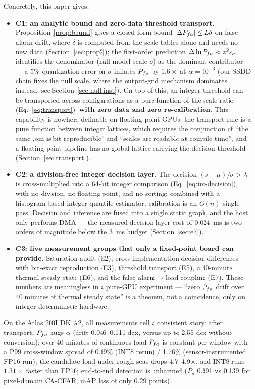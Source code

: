 Concretely, this paper gives:
\begin{itemize}
\item \textbf{C1: an analytic bound and zero-data threshold transport.}
Proposition~\ref{prop:bound} gives a closed-form bound $|\Delta P_{fa}|\le L\delta$ on false-alarm drift, where $\delta$ is computed from the scale tables alone and needs no new data (Section~\ref{sec:prop2}); the first-order prediction $\Delta\ln P_{fa}\approx z^2\varepsilon_\sigma$ identifies the denominator (null-model scale $\sigma$) as the dominant contributor --- a 5\% quantization error on $\sigma$ inflates $P_{fa}$ by $1.6\times$ at $\alpha=10^{-3}$ (our SSDD chain fixes the null scale, where the output-grid mechanism dominates instead; see Section~\ref{sec:null-inst}).
On top of this, an integer threshold can be transported across configurations as a pure function of the scale ratio (Eq.~\eqref{eq:transport}), \textbf{with zero data and zero re-calibration}.
This capability is nowhere definable on floating-point GPUs: the transport rule is a pure function between integer lattices, which requires the conjunction of ``the same .om is bit-reproducible'' and ``scales are readable at compile time'', and a floating-point pipeline has no global lattice carrying the decision threshold (Section~\ref{sec:transport}).
\item \textbf{C2: a division-free integer decision layer.}
The decision $(s-\mu)/\sigma>\lambda$ is cross-multiplied into a 64-bit integer comparison (Eq.~\eqref{eq:int-decision}), with no division, no floating point, and no sorting; combined with a histogram-based integer quantile estimator, calibration is an $O(n)$ single pass.
Decision and inference are fused into a single static graph, and the host only performs DMA --- the measured decision-layer cost of 0.024~ms is two orders of magnitude below the 3~ms budget (Section~\ref{sec:e7}).
\item \textbf{C3: five measurement groups that only a fixed-point board can provide.}
Saturation audit (E2), cross-implementation decision differences with bit-exact reproduction (E3), threshold transport (E5), a 40-minute thermal steady state (E6), and the false-alarm$\to$load coupling (E7).
These numbers are meaningless in a pure-GPU experiment --- ``zero $P_{fa}$ drift over 40 minutes of thermal steady state'' is a theorem, not a coincidence, only on integer-deterministic hardware.
\end{itemize}

On the Atlas 200I DK A2, all measurements tell a consistent story: after transport, $P_{fa}$ hugs $\alpha$ (drift 0.046--0.111 dex, versus up to 2.55 dex without conversion); over 40 minutes of continuous load $P_{fa}$ is constant per window with a P99 cross-window spread of 0.69\% (INT8 rerun) / 1.76\% (sensor-instrumented FP16 run); the candidate load under rough seas drops 4.7--4.9$\times$, and INT8 runs $1.31\times$ faster than FP16; end-to-end detection is unharmed ($P_d$ 0.991 vs 0.139 for pixel-domain CA-CFAR, mAP loss of only 0.29 points).

